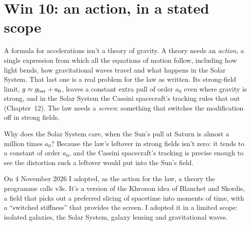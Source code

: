 \section{Win 10: an action, in a stated scope}

A formula for accelerations isn't a theory of gravity. A theory needs an \emph{action}, a single expression from which all the equations of motion follow, including how light bends, how gravitational waves travel and what happens in the Solar System. That last one is a real problem for the law as written. Its strong-field limit, $g\approx g_{\rm bar}+a_0$, leaves a constant extra pull of order $a_0$ even where gravity is strong, and in the Solar System the Cassini spacecraft's tracking rules that out (Chapter~12). The law needs a \emph{screen}: something that switches the modification off in strong fields.

Why does the Solar System care, when the Sun's pull at Saturn is almost a million times $a_0$? Because the law's leftover in strong fields isn't zero: it tends to a constant of order $a_0$, and the Cassini spacecraft's tracking is precise enough to see the distortion such a leftover would put into the Sun's field.








On 4 November 2026 I adopted, as the action for the law, a theory the programme calls v3s. It's a version of the Khronon idea of Blanchet and Skordis, a field that picks out a preferred slicing of spacetime into moments of time, with a ``switched stiffness'' that provides the screen. I adopted it in a limited scope: isolated galaxies, the Solar System, galaxy lensing and gravitational waves.

